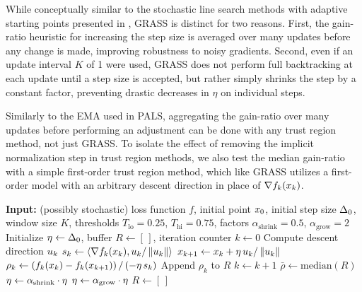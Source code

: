 While conceptually similar to the stochastic line search methods with adaptive starting points presented in \cite{vaswani2019painless}, GRASS is distinct for two reasons. First, the gain-ratio heuristic for increasing the step size is averaged over many updates before any change is made, improving robustness to noisy gradients. Second, even if an update interval $K$ of 1 were used, GRASS does not perform full backtracking at each update until a step size is accepted, but rather simply shrinks the step by a constant factor, preventing drastic decreases in $\eta$ on individual steps.

Similarly to the EMA used in PALS, aggregating the gain-ratio over many updates before performing an adjustment can be done with any trust region method, not just GRASS. To isolate the effect of removing the implicit normalization step in trust region methods, we also test the median gain-ratio with a simple first-order trust region method, which like GRASS utilizes a first-order model with an arbitrary descent direction in place of $\nabla f_k(x_{k})$.

\begin{algorithm}[H]
\caption{First-Order Trust Region with Median Gain Ratio}
\label{alg:first-order-tr}
\begin{algorithmic}[1]
\State \textbf{Input:} (possibly stochastic) loss function $f$, initial point $x_{0}$, initial step size $\Delta_0$, window size $K$, thresholds $T_{\text{lo}} = 0.25$, $T_{\text{hi}} = 0.75$, factors $\alpha_{\text{shrink}} = 0.5$, $\alpha_{\text{grow}} = 2$
\State Initialize $\eta \gets \Delta_0$, buffer $R \gets [\,]$, iteration counter $k \gets 0$
    \State Compute descent direction $u_{k}$
    \State $s_k \gets \langle \nabla f_k(x_{k}), u_{k} / \left \lVert u_{k} \right \rVert \rangle$ 
    \State $x_{k+1} \gets x_{k} + \eta \, u_{k} / \left \lVert u_{k} \right \rVert$
    \State $\rho_k \gets \left(f_k(x_{k}) - f_k(x_{k+1})\right) / \left(-\eta \, s_k\right)$
    \State Append $\rho_k$ to $R$
    \State $k \gets k + 1$
        \State $\bar{\rho} \gets \text{median}(R)$
            \State $\eta \gets \alpha_{\text{shrink}} \cdot \eta$
            \State $\eta \gets \alpha_{\text{grow}} \cdot \eta$
        \EndIf
        \State $R \gets [\,]$
    \EndIf
\EndFor
\end{algorithmic}
\end{algorithm}

